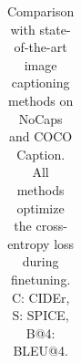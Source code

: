 \begin{table}[!t]
{\begin{tabular}	{l  l |  c  c  c  c  c  c  c  c | c  c }
	\end{tabular}
 	}
  \vspace{-2ex}
	\caption
	{
	\small	
		Comparison with state-of-the-art image captioning methods on NoCaps and COCO Caption.
		All methods optimize the cross-entropy loss during finetuning. C: CIDEr, S: SPICE, B@4: BLEU@4.	
	}
 \vspace{-1ex}
	\label{tbl:caption}
\end{table}		


